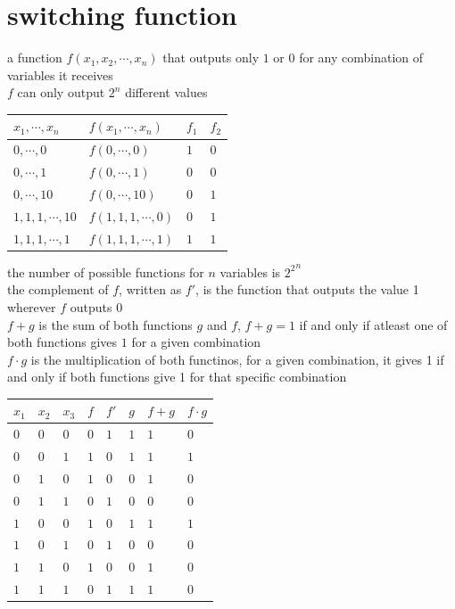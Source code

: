 \documentclass[a4paper,12pt]{article}
\begin{document}
\section{switching function}
\label{sec:org4e6eeb6}
a function \(f(x_1, x_2, \cdots, x_n)\) that outputs only \(1\) or \(0\) for any combination of variables it receives\\
\(f\) can only output \(2^n\) different values\\
\begin{my_example}
\begin{tabular}{llll}
\(x_1, \cdots, x_n\) & \(f(x_1, \cdots, x_n)\) & \(f_1\) & \(f_2\)\\
\hline
\(0,\cdots,0\) & \(f(0,\cdots,0)\) & \(1\) & \(0\)\\
\(0, \cdots, 1\) & \(f(0, \cdots, 1)\) & \(0\) & \(0\)\\
\(0, \cdots, 10\) & \(f(0, \cdots, 10)\) & \(0\) & \(1\)\\
\(1,1,1, \cdots, 10\) & \(f(1,1,1, \cdots, 0)\) & \(0\) & \(1\)\\
\(1,1,1, \cdots, 1\) & \(f(1,1,1, \cdots, 1)\) & \(1\) & \(1\)\\
\end{tabular}
\end{my_example}
the number of possible functions for \(n\) variables is \({2^2}^n\)\\
the complement of \(f\), written as \(f'\), is the function that outputs the value 1 wherever \(f\) outputs 0\\
\(f+g\) is the sum of both functions \(g\) and \(f\), \(f + g = 1\) if and only if atleast one of both functions gives \(1\) for a given combination\\
\(f \cdot g\) is the multiplication of both functinos, for a given combination, it gives 1 if and only if both functions give 1 for that specific combination\\
\begin{my_example}
\begin{tabular}{llllllll}
\(x_1\) & \(x_2\) & \(x_3\) & \(f\) & \(f'\) & \(g\) & \(f + g\) & \(f \cdot g\)\\
\hline
\(0\) & \(0\) & \(0\) & \(0\) & \(1\) & \(1\) & \(1\) & \(0\)\\
\(0\) & \(0\) & \(1\) & \(1\) & \(0\) & \(1\) & \(1\) & \(1\)\\
\(0\) & \(1\) & \(0\) & \(1\) & \(0\) & \(0\) & \(1\) & \(0\)\\
\(0\) & \(1\) & \(1\) & \(0\) & \(1\) & \(0\) & \(0\) & \(0\)\\
\(1\) & \(0\) & \(0\) & \(1\) & \(0\) & \(1\) & \(1\) & \(1\)\\
\(1\) & \(0\) & \(1\) & \(0\) & \(1\) & \(0\) & \(0\) & \(0\)\\
\(1\) & \(1\) & \(0\) & \(1\) & \(0\) & \(0\) & \(1\) & \(0\)\\
\(1\) & \(1\) & \(1\) & \(0\) & \(1\) & \(1\) & \(1\) & \(0\)\\
\end{tabular}
\end{my_example}
\end{document}
